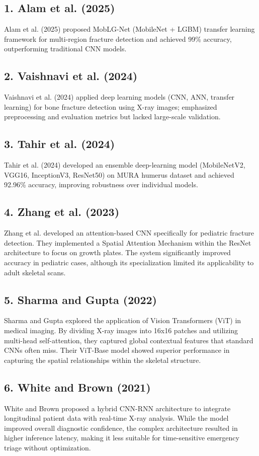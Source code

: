 \documentclass[a4paper,12pt]{report}
\begin{document}
    \subsection*{1. Alam et al. (2025)}
    Alam et al. (2025) proposed MobLG-Net (MobileNet + LGBM) transfer learning framework for multi-region fracture detection and achieved 99\% accuracy, outperforming traditional CNN models.

    \subsection*{2. Vaishnavi et al. (2024)}
    Vaishnavi et al. (2024) applied deep learning models (CNN, ANN, transfer learning) for bone fracture detection using X-ray images; emphasized preprocessing and evaluation metrics but lacked large-scale validation.

    \subsection*{3. Tahir et al. (2024)}
    Tahir et al. (2024) developed an ensemble deep-learning model (MobileNetV2, VGG16, InceptionV3, ResNet50) on MURA humerus dataset and achieved 92.96\% accuracy, improving robustness over individual models.

    \subsection*{4. Zhang et al. (2023)}
    Zhang et al. developed an attention-based CNN specifically for pediatric fracture detection. They implemented a Spatial Attention Mechanism within the ResNet architecture to focus on growth plates. The system significantly improved accuracy in pediatric cases, although its specialization limited its applicability to adult skeletal scans.

    \subsection*{5. Sharma and Gupta (2022)}
    Sharma and Gupta explored the application of Vision Transformers (ViT) in medical imaging. By dividing X-ray images into 16x16 patches and utilizing multi-head self-attention, they captured global contextual features that standard CNNs often miss. Their ViT-Base model showed superior performance in capturing the spatial relationships within the skeletal structure.

    \subsection*{6. White and Brown (2021)}
    White and Brown proposed a hybrid CNN-RNN architecture to integrate longitudinal patient data with real-time X-ray analysis. While the model improved overall diagnostic confidence, the complex architecture resulted in higher inference latency, making it less suitable for time-sensitive emergency triage without optimization.
\end{document}
